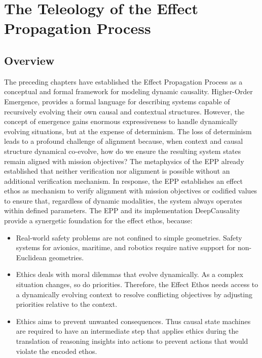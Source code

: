 \section{The Teleology of the Effect Propagation Process}
\label{sec:teleology}

\subsection{Overview}

The preceding chapters have established the Effect Propagation Process as a conceptual and formal framework for modeling dynamic causality. Higher-Order Emergence, provides a formal language for describing systems capable of recursively evolving their own causal and contextual structures. However, the concept of emergence gains enormous expressiveness to handle dynamically evolving situations, but at the expense of determinism. The loss of determinism leads to a profound challenge of alignment because, when context and causal structure dynamical co-evolve, how do we ensure the resulting system states remain aligned with mission objectives? The metaphysics of the EPP already established that neither verification nor alignment is possible without an additional verification mechanism. In response, the EPP establishes an effect ethos as mechanism to verify alignment with mission objectives or codified values to ensure that, regardless of dynamic modalities, the system always operates within defined parameters. The EPP and its implementation DeepCausality provide a synergetic foundation for the effect ethos, because:

\begin{itemize}
    \item Real-world safety problems are not confined to simple geometries. Safety systems for avionics, maritime, and robotics require native support
  for non-Euclidean geometries.
    \item Ethics deals with moral dilemmas that evolve dynamically. As a complex situation changes, so do priorities. Therefore, the Effect Ethos needs access to a dynamically evolving context to resolve conflicting objectives by  adjusting priorities relative to the context. 
    \item Ethics aims to prevent unwanted consequences. Thus causal state machines are required to have an intermediate step that applies ethics during the translation of reasoning insights into actions to prevent actions that would violate the encoded ethos. 
\end{itemize}

